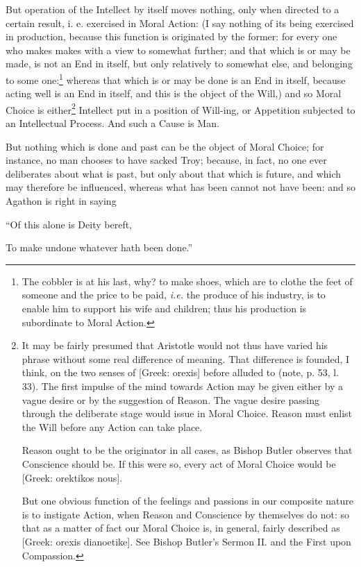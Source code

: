 But operation of the Intellect by itself moves nothing, only when directed to a
certain result, i. e. exercised in Moral Action: (I say nothing of its being
exercised in production, because this function is originated by the former: for
every one who makes makes with a view to somewhat further; and that which is or
may be made, is not an End in itself, but only relatively to somewhat else, and
belonging to some one:\footnote{The cobbler is at his last, why? to make shoes, which are to clothe the feet of
someone and the price to be paid, \emph{i.e.} the produce of his industry, is
to enable him to support his wife and children; thus his production is
subordinate to Moral Action.}
whereas that which is or may be done is an End in itself, because acting well
is an End in itself, and this is the object of the Will,) and so Moral Choice
is either\footnote{It may be fairly presumed that Aristotle would not thus have varied his phrase
without some real difference of meaning. That difference is founded, I think,
on the two senses of [Greek: orexis] before alluded to (note, p. 53, l. 33).
The first impulse of the mind towards Action may be given either by a vague
desire or by the suggestion of Reason. The vague desire passing through the
deliberate stage would issue in Moral Choice. Reason must enlist the Will
before any Action can take place.

Reason ought to be the originator in all cases, as Bishop Butler observes
that Conscience should be. If this were so, every act of Moral Choice would be
[Greek: orektikos nous].

But one obvious function of the feelings and passions in our composite
nature is to instigate Action, when Reason and Conscience by themselves do not:
so that as a matter of fact our Moral Choice is, in general, fairly described
as [Greek: orexis dianoetike]. See Bishop Butler’s Sermon II. and the
First upon Compassion.}
Intellect put in a position of Will-ing, or Appetition subjected to an
Intellectual Process. And such a Cause is Man.

But nothing which is done and past can be the object of Moral Choice; for
instance, no man chooses to have sacked Troy; because, in fact, no one ever
deliberates about what is past, but only about that which is future, and which
may therefore be influenced, whereas what has been cannot not have been: and so
Agathon is right in saying

“Of this alone is Deity bereft,

To make undone whatever hath been done.”

